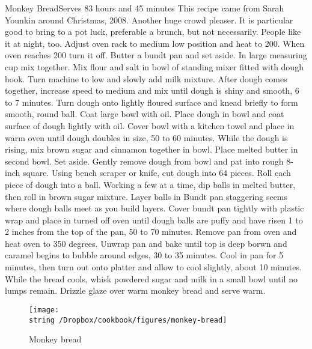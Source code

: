 \begin{recipe}{Monkey Bread}{Serves 8}{3 hours and 45 minutes}
\freeform This recipe came from Sarah Younkin around Christmas, 2008.  Another huge crowd pleaser.  It is particular good to bring to a pot luck, preferable a brunch, but not necessarily.  People like it at night, too.
\newstep
Adjust oven rack to medium low position and heat to 200\0.  When oven reaches 200\0 turn it off.
Butter a bundt pan and set aside.
In large measuring cup mix together.
Mix flour and salt in bowl of standing mixer fitted with dough hook.
\newstep
Turn machine to low and slowly add milk mixture.  After dough comes together, increase speed to medium and mix until dough is shiny and smooth, 6 to 7 minutes. Turn dough onto lightly floured surface and knead briefly to form smooth, round ball. Coat large bowl with oil. Place dough in bowl and coat surface of dough lightly with oil. Cover bowl with a kitchen towel and place in warm oven until dough doubles in size, 50 to 60 minutes.
While the dough is rising, mix brown sugar and cinnamon together in bowl. Place melted butter in second bowl. Set aside.
\newstep
Gently remove dough from bowl and pat into rough 8-inch square. Using bench scraper or knife, cut dough into 64 pieces.
\newstep
Roll each piece of dough into a ball. Working a few at a time, dip balls in melted butter, then roll in brown sugar mixture. Layer balls in Bundt pan staggering seems where dough balls meet as you build layers.
\newstep
Cover bundt pan tightly with plastic wrap and place in turned off oven until dough balls are puffy and have risen 1 to 2 inches from the top of the pan, 50 to 70 minutes.
\newstep
Remove pan from oven and heat oven to 350 degrees. Unwrap pan and bake until top is deep borwn and caramel begins to bubble around edges, 30 to 35 minutes. Cool in pan for 5 minutes, then turn out onto platter and allow to cool slightly, about 10 minutes.
While the bread cools, whisk powdered sugar and milk in a small bowl until no lumps remain. Drizzle glaze over warm monkey bread and serve warm. 
\end{recipe}
\begin{figure}
\begin{center}
\texttt{[image: \\string~/Dropbox/cookbook/figures/monkey-bread]}
\end{center}
\caption*{Monkey bread}
\end{figure}
